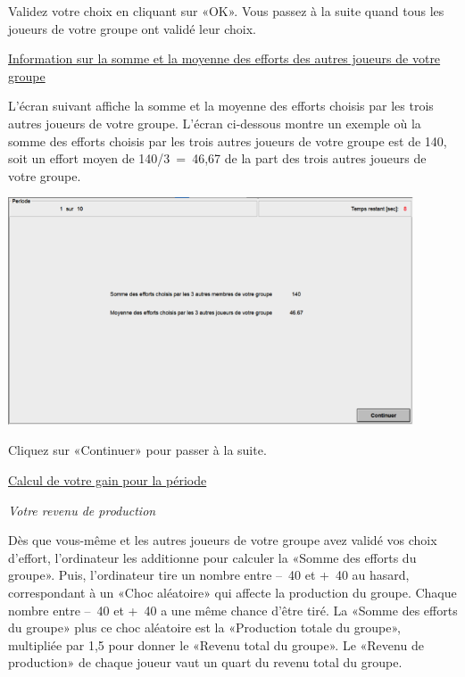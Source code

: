 \begin{Article}
\begin{refsection}[Lebourges]
\begin{appendices}
\vspace{0,2cm}
Validez votre choix en cliquant sur «OK». Vous passez à la suite quand
tous les joueurs de votre groupe ont validé leur choix.

\vspace{0,3cm}
\ul{Information sur la somme et la moyenne des efforts des autres
joueurs de votre groupe}

\vspace{0,2cm}
L'écran suivant affiche la somme et la moyenne des efforts choisis par
les trois autres joueurs de votre groupe. L'écran ci-dessous montre un
exemple où la somme des efforts choisis par les trois autres joueurs de
votre groupe est de 140, soit un effort moyen de 140/3~=~46,67 de la
part des trois autres joueurs de votre groupe.

\vspace{0,2cm}
\includegraphics[width = 0.9\textwidth]{05_fig2-annexII.png}
\vspace{0,2cm}

Cliquez sur «Continuer» pour passer à la suite.

\vspace{0,3cm}
\ul{Calcul de votre gain pour la période}

\vspace{0,2cm}
\emph{Votre revenu de production}

\vspace{0,2cm}
Dès que vous-même et les autres joueurs de votre groupe avez validé vos
choix d'effort, l'ordinateur les additionne pour calculer la «Somme des
efforts du groupe». Puis, l'ordinateur tire un nombre entre --~40 et
+~40 au hasard, correspondant à un «Choc aléatoire» qui affecte la
production du groupe. Chaque nombre entre --~40 et +~40 a une même
chance d'être tiré. La «Somme des efforts du groupe» plus ce choc
aléatoire est la «Production totale du groupe», multipliée par 1,5
pour donner le «Revenu total du groupe». Le «Revenu de production»
de chaque joueur vaut un quart du revenu total du groupe.


\end{appendices}
\end{refsection}
\end{Article}
